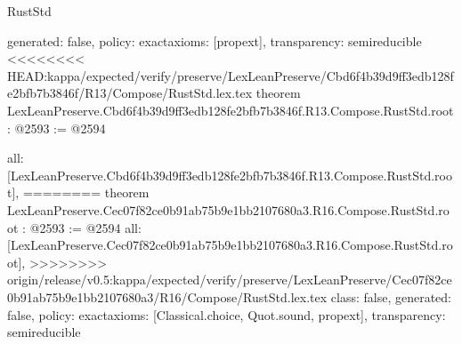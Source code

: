 \begin{lexlean}{RustStd}
\begin{coremodule}
{\begin{coremodule}
{{{{  generated: false,
  policy: exact{axioms: [propext]},
  transparency: semireducible
}
<<<<<<<< HEAD:kappa/expected/verify/preserve/LexLeanPreserve/Cbd6f4b39d9ff3edb128fe2bfb7b3846f/R13/Compose/RustStd.lex.tex
theorem LexLeanPreserve.Cbd6f4b39d9ff3edb128fe2bfb7b3846f.R13.Compose.RustStd.root : @2593 := @2594 {
  all: [LexLeanPreserve.Cbd6f4b39d9ff3edb128fe2bfb7b3846f.R13.Compose.RustStd.root],
========
theorem LexLeanPreserve.Cec07f82ce0b91ab75b9e1bb2107680a3.R16.Compose.RustStd.root : @2593 := @2594 {
  all: [LexLeanPreserve.Cec07f82ce0b91ab75b9e1bb2107680a3.R16.Compose.RustStd.root],
>>>>>>>> origin/release/v0.5:kappa/expected/verify/preserve/LexLeanPreserve/Cec07f82ce0b91ab75b9e1bb2107680a3/R16/Compose/RustStd.lex.tex
  class: false,
  generated: false,
  policy: exact{axioms: [Classical.choice, Quot.sound, propext]},
  transparency: semireducible
}

}}}}
\end{coremodule}}
\end{coremodule}
\end{lexlean}
